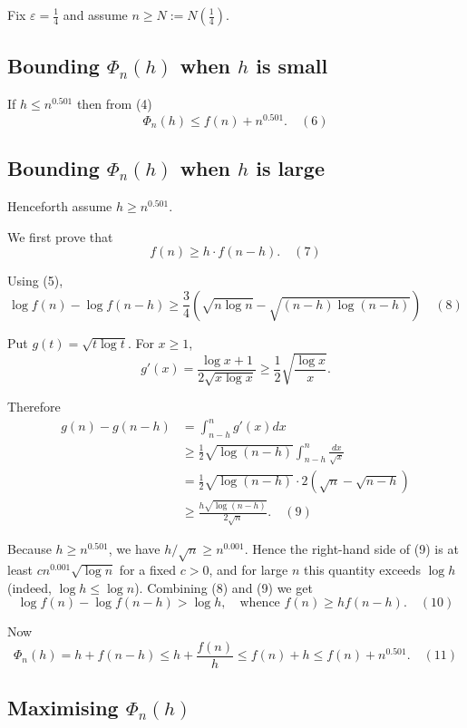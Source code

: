 \documentclass[12pt,a4paper]{article}
\theoremstyle{definition}
\begin{document}
        Fix $\varepsilon = \frac{1}{4}$ and assume $n \geq N := N(\frac{1}{4})$.

        \subsection*{Bounding $\Phi_n(h)$ when $h$ is small}

        If $h \leq n^{0.501}$ then from (4)
        $$\Phi_n(h) \leq f(n) + n^{0.501}. \quad (6)$$

        \subsection*{Bounding $\Phi_n(h)$ when $h$ is large}

        Henceforth assume $h \geq n^{0.501}$.

        We first prove that
        $$f(n) \geq h \cdot f(n - h). \quad (7)$$

        Using (5),
        $$\log f(n) - \log f(n - h) \geq \frac{3}{4}(\sqrt{n \log n} - \sqrt{(n - h) \log(n - h)}) \quad (8)$$

        Put $g(t) = \sqrt{t \log t}$. For $x \geq 1$,
        $$g'(x) = \frac{\log x + 1}{2\sqrt{x \log x}} \geq \frac{1}{2}\sqrt{\frac{\log x}{x}}.$$

        Therefore
        \begin{align}
            g(n) - g(n - h) &= \int_{n-h}^n g'(x) dx \\
            &\geq \frac{1}{2}\sqrt{\log(n - h)} \int_{n-h}^n \frac{dx}{\sqrt{x}} \\
            &= \frac{1}{2}\sqrt{\log(n - h)} \cdot 2(\sqrt{n} - \sqrt{n - h}) \\
            &\geq \frac{h\sqrt{\log(n-h)}}{2\sqrt{n}}. \quad (9)
        \end{align}

        Because $h \geq n^{0.501}$, we have $h/\sqrt{n} \geq n^{0.001}$. Hence the right-hand side of (9) is at least $c n^{0.001}\sqrt{\log n}$ for a fixed $c > 0$, and for large $n$ this quantity exceeds $\log h$ (indeed, $\log h \leq \log n$). Combining (8) and (9) we get
        $$\log f(n) - \log f(n - h) > \log h, \quad \text{whence } f(n) \geq h f(n - h). \quad (10)$$

        Now
        $$\Phi_n(h) = h + f(n - h) \leq h + \frac{f(n)}{h} \leq f(n) + h \leq f(n) + n^{0.501}. \quad (11)$$

        \subsection*{Maximising $\Phi_n(h)$}
\end{document}
